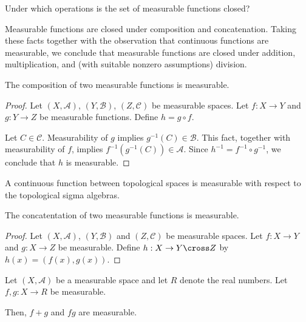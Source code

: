 
\sbasic














\sstart
{}


Under which operations is
the set of measurable
functions closed?


Measurable functions are closed
under composition and concatenation.
Taking these facts
together with the observation
that continuous functions
are measurable, we conclude
that measurable
functions are closed under
addition, multiplication,
and (with suitable nonzero
assumptions) division.


\begin{prop}
The composition of two
measurable functions
is measurable.
\begin{proof}
Let
$(X, \mathcal{A})$,
$(Y, \mathcal{B})$,
$(Z, \mathcal{C})$
be measurable spaces.
Let $f: X \to Y$
and $g: Y \to Z$ be
measurable functions.
Define $h = g \circ f$.

Let $C \in \mathcal{C}$.
Measurability of $g$
implies
$g^{-1}(C) \in \mathcal{B}$.
This fact, together with
measurability of $f$,
implies
$f^{-1}(g^{-1}(C)) \in \mathcal{A}$.
Since $h^{-1} = f^{-1} \circ g^{-1}$,
we conclude that
$h$ is measurable.
\end{proof}
\end{prop}

\begin{prop}
  A continuous function
  between topological
  spaces
  is measurable with
  respect to the
  topological sigma algebras.
\end{prop}

\begin{prop}
  The concatentation of
  two measurable functions
  is measurable.
  \begin{proof}
Let
$(X, \mathcal{A})$,
$(Y, \mathcal{B})$
and
$(Z, \mathcal{C})$
be measurable spaces.
Let
$f: X \to Y$
and
$g: X \to Z$
be measurable.
Define
$h: X \to Y \cross Z$
by $h(x) = (f(x), g(x))$.
  \end{proof}
\end{prop}

\begin{prop}
Let $(X, \mathcal{A})$
be a measurable space
and let $R$ denote the
real numbers.
Let
$f,g: X \to R$
be measurable.

Then, $f+g$ and $fg$ are measurable.
\end{prop}
\strats

